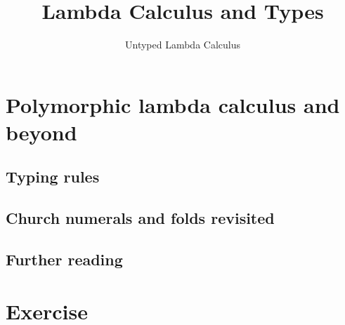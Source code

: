 \title{Lambda Calculus and Types}
\subtitle{Untyped Lambda Calculus}

\begin{frame}
\maketitle
\end{frame}

\section{Polymorphic lambda calculus and beyond}
\subsection{Typing rules}
\subsection{Church numerals and folds revisited}
\subsection{Further reading}
\section*{Exercise}



